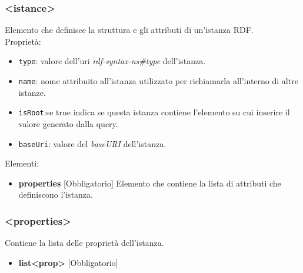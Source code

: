\documentclass[12pt,a4paper,italian]{article}
\begin{document}
\subsubsection{<istance>}
Elemento che definisce la struttura e gli attributi di un'istanza RDF.\\
Proprietà:
\begin{itemize}
	\item \texttt{type}: valore dell'uri \emph{rdf-syntax-ns\#type} dell'istanza.
	\item \texttt{name}: nome attribuito all'istanza utilizzato per richiamarla all'interno di altre istanze. 
	\item \texttt{isRoot}:se true indica se questa istanza contiene l'elemento su cui inserire il valore generato dalla query.
	\item \texttt{baseUri}: valore del \emph{baseURI} dell'istanza.
\end{itemize}
Elementi:
\begin{itemize}
	\item \textbf{properties} [Obbligatorio] Elemento che contiene la lista di attributi che definiscono l'istanza.
\end{itemize}
\subsubsection{<properties>}
Contiene la lista delle proprietà dell'istanza.
\begin{itemize}
	\item \textbf{list<prop>} [Obbligatorio]
\end{itemize}
\end{document}
